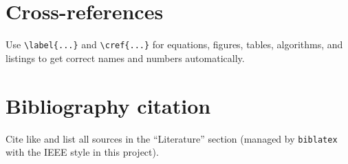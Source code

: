 \section{Cross-references}
Use \verb|\label{...}| and \verb|\cref{...}| for equations, figures, tables, algorithms, and listings to get correct names and numbers automatically.

\section{Bibliography citation}
Cite like \cite{porter2008} and list all sources in the “Literature” section (managed by \texttt{biblatex} with the IEEE style in this project).